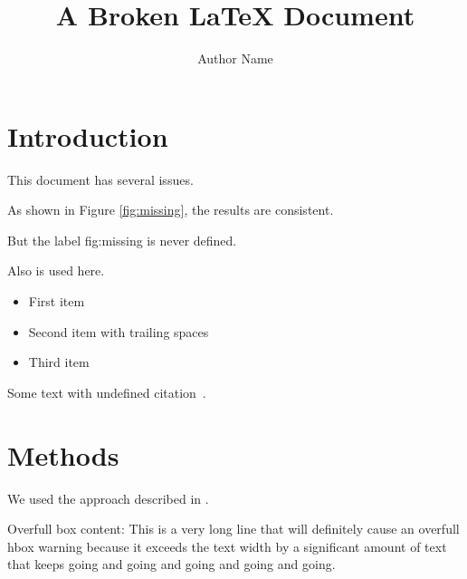 \documentclass{article}
\title{A Broken LaTeX Document}
\author{Author Name}
\begin{document}
\maketitle

\section{Introduction}

This document has several issues.

As shown in Figure \ref{fig:missing}, the results are consistent.

But the label fig:missing is never defined.

Also \undefinedcommand is used here.

\begin{itemize}
\item First item
\item Second item with trailing spaces   
\item Third item
\end{itemize}

Some text with undefined citation~\cite{nonexistent2020}.

\section{Methods}

We used the approach described in \cite{jones2019}.



Overfull box content: This is a very long line that will definitely cause an overfull hbox warning because it exceeds the text width by a significant amount of text that keeps going and going and going and going and going.
\end{document}

